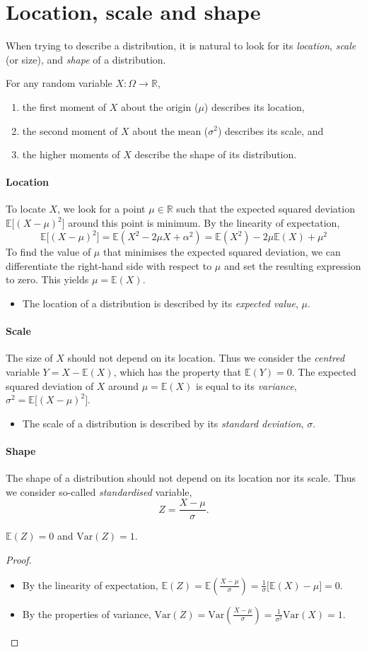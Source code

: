 \documentclass[lecture]{csm}
\newcommand{\R}{\mathbb{R}}
\newcommand{\expe}{\mathbb{E}}
\newcommand{\var}{\text{Var}}
\def\it{\item}
\def\bit{\begin{itemize}}
\def\eit{\end{itemize}}
\def\ben{\begin{enumerate}}
\def\een{\end{enumerate}}
\begin{document}
\section{Location, scale and shape}
When trying to describe a distribution, it is natural to look for its \emph{location}, \emph{scale} (or size), and \emph{shape} of a distribution.

For any random variable $X:\Omega\to\R$,
\ben
\it the first moment of $X$ about the origin ($\mu$)  describes its location, 
\it the second moment of $X$ about the mean ($\sigma^2$) describes its scale, and
\it the higher moments of $X$ describe the shape of its distribution.
\een

\paragraph{Location}
To locate $X$, we look for a point $\mu\in\R$ such that the expected squared deviation $\expe\big[(X-\mu)^2\big]$ around this point is minimum. By the linearity of expectation,
\[
\expe\big[(X-\mu)^2\big] = \expe(X^2 - 2\mu X + \alpha^2) = \expe(X^2) - 2\mu\expe(X) + \mu^2
\]
To find the value of $\mu$ that minimises the expected squared deviation, we can differentiate the right-hand side with respect to $\mu$ and set the resulting expression to zero. This yields $\mu=\expe(X)$.
\bit
\it The location of a distribution is described by its \emph{expected value}, $\mu$.
\eit

\paragraph{Scale}
The size of $X$ should not depend on its location. Thus we consider the \emph{centred} variable $Y=X-\expe(X)$, which has the property that $\expe(Y)=0$. The expected squared deviation of $X$ around $\mu=\expe(X)$ is equal to its \emph{variance}, $\sigma^2 = \expe\big[(X-\mu)^2\big]$. 
\bit
\it The scale of a distribution is described by its \emph{standard deviation}, $\sigma$.
\eit

\paragraph{Shape}
The shape of a distribution should not depend on its location nor its scale. Thus we consider so-called \emph{standardised} variable,
\[
Z = \frac{X-\mu}{\sigma}.
\]
\vspace*{-4ex}
\begin{lemma}
$\expe(Z)=0$ and $\var(Z)=1$.
\end{lemma}
\begin{proof}
\bit
\it By the linearity of expectation, $\displaystyle\expe(Z)=\expe\left(\frac{X-\mu}{\sigma}\right)=\frac{1}{\sigma}\big[\expe(X)-\mu\big] = 0$.
\it By the properties of variance, $\displaystyle\var(Z)=\var\left(\frac{X-\mu}{\sigma}\right)=\frac{1}{\sigma^2}\var(X) = 1$.
\eit
\end{proof}
\end{document}
